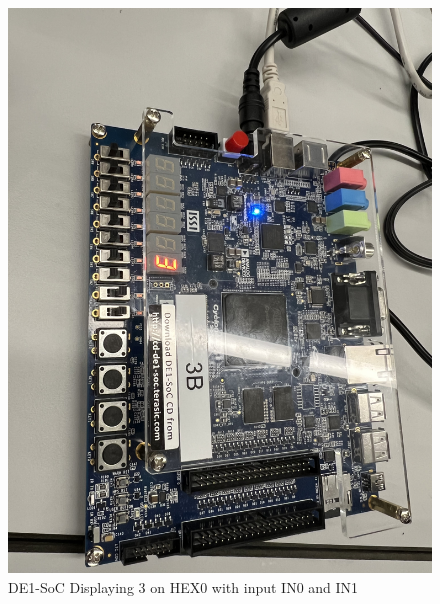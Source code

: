 \documentclass[
	letterpaper, %
	10pt, %
]{CSUniSchoolLabReport}
\begin{document}
\begin{figure}[H]
  \centering
  \includegraphics[width=.9\textwidth]{Figures/Disp_3.jpg}
  \caption{DE1-SoC Displaying 3 on HEX0 with input IN0 and IN1}
  \label{fig:6}
\end{figure}
\end{document}
